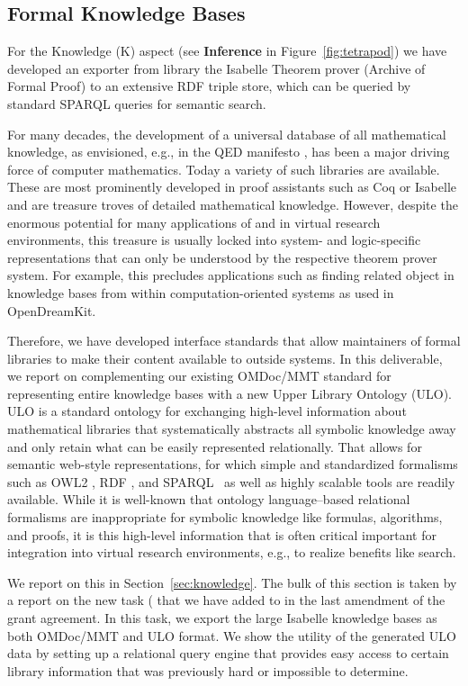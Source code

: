 \subsection{Formal Knowledge Bases}\label{sec:isabelle}
For the Knowledge (K) aspect (see \textbf{Inference} in Figure~\ref{fig:tetrapod}) we have developed an exporter from library the Isabelle Theorem prover (Archive of Formal Proof) to an extensive RDF triple store, which can be queried by standard SPARQL queries for semantic search.
  
For many decades, the development of a universal database of all mathematical knowledge, as envisioned, e.g., in the QED manifesto \cite{qed}, has been a major driving force of computer mathematics.
Today a variety of such libraries are available.
These are most prominently developed in proof assistants such as Coq \cite{coq} or Isabelle \cite{isabelle} and are treasure troves of detailed mathematical knowledge.
However, despite the enormous potential for many applications of and in virtual research environments, this treasure is usually locked into system- and logic-specific representations that can only be understood by the respective theorem prover system.
For example, this precludes applications such as finding related object in knowledge bases from within computation-oriented systems as used in OpenDreamKit.

Therefore, we have developed interface standards that allow maintainers of formal libraries to make their content available to outside systems.
In this deliverable, we report on complementing our existing OMDoc/MMT standard for representing entire knowledge bases with a new Upper Library Ontology (ULO).
ULO is a standard ontology for exchanging high-level information about mathematical libraries that systematically abstracts all symbolic knowledge away and only retain what can be easily represented relationally.
That allows for semantic web-style representations, for which simple and standardized formalisms such as OWL2 \cite{w3c:owl2-xml}, RDF \cite{rdf}, and SPARQL~\cite{w3c:SPARQL-Rec:13} as well as highly scalable tools are readily available.
While it is well-known that ontology language--based relational formalisms are inappropriate for symbolic knowledge like formulas, algorithms, and proofs, it is this high-level information that is often critical important for integration into virtual research environments, e.g., to realize benefits like search.

We report on this in Section~\ref{sec:knowledge}.  The bulk of this section is taken by a report on the new task ( that we have added to \pn in the last amendment of the grant agreement. In this task, we export the large Isabelle knowledge bases  as both OMDoc/MMT and ULO format.  We show the utility of the generated ULO data by setting up a relational query engine that provides easy access to certain library information that was previously hard or impossible to determine.

